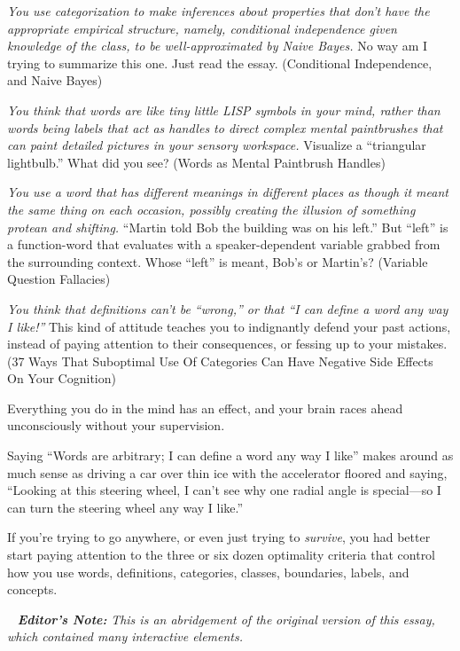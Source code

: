 {
 \textit{You use categorization to make inferences about properties
that don't have the appropriate empirical structure,
namely, conditional independence given knowledge of the class, to be
well-approximated by Naive Bayes.} No way am I trying to summarize this
one. Just read the essay. (Conditional Independence, and Naive Bayes)}

{
 \textit{You think that words are like tiny little LISP symbols in
your mind, rather than words being labels that act as handles to direct
complex mental paintbrushes that can paint detailed pictures in your
sensory workspace.} Visualize a ``triangular
lightbulb.'' What did you see? (Words as Mental
Paintbrush Handles)}

{
 \textit{You use a word that has different meanings in different
places as though it meant the same thing on each occasion, possibly
creating the illusion of something protean and shifting.}
``Martin told Bob the building was on his
left.'' But
``left'' is a function-word that
evaluates with a speaker-dependent variable grabbed from the
surrounding context. Whose ``left''
is meant, Bob's or Martin's? (Variable
Question Fallacies)}

{
 \textit{You think that definitions can't be
``wrong,'' or that
``I can define a word any way I
like!''} This kind of attitude teaches you to
indignantly defend your past actions, instead of paying attention to
their consequences, or fessing up to your mistakes. (37 Ways That
Suboptimal Use Of Categories Can Have Negative Side Effects On Your
Cognition)}

{
 Everything you do in the mind has an effect, and your brain races
ahead unconsciously without your supervision.}

{
 Saying ``Words are arbitrary; I can define a word
any way I like'' makes around as much sense as
driving a car over thin ice with the accelerator floored and saying,
``Looking at this steering wheel, I
can't see why one radial angle is special---so I can
turn the steering wheel any way I like.''}

{
 If you're trying to go anywhere, or even just
trying to \textit{survive}, you had better start paying attention to
the three or six dozen optimality criteria that control how you use
words, definitions, categories, classes, boundaries, labels, and
concepts.}

\myendsectiontext


{
\ \textit{ }\textbf{\textit{Editor's
Note:}}\textit{ This is an abridgement of the
}\textit{original}\textit{ version of this essay, which contained many
interactive elements.}}

